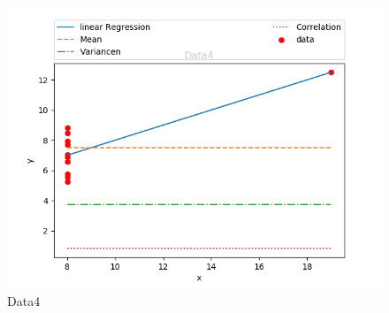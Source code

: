 \documentclass[a4paper]{article}
\begin{document}
	\begin{figure}[!ht]
		\centering
		\includegraphics[width=0.7\linewidth]{Data4}
		\caption{Data4}
		\label{fig:data1}
	\end{figure}
	
\end{document}
